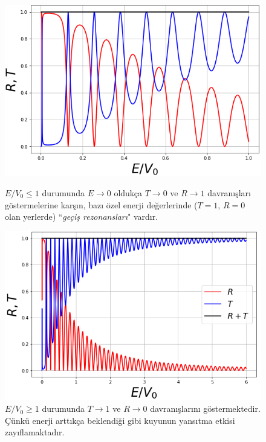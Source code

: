 \documentclass[a4paper,12pt, twoside]{article}
\begin{document}
\begin{figure}[hbtp]
\begin{minipage}{.48\textwidth}
	\centering
	\includegraphics[width=\linewidth]{figurler/SonluKuyu_Potansiyeli_TR_EV0_1.png}
	\caption{$E/V_0 \leq 1$ durumunda $E\rightarrow0$ oldukça $T\rightarrow0$ ve $R\rightarrow1$ davranışları göstermelerine karşın, bazı özel enerji değerlerinde ($T=1$, $R=0$ olan yerlerde) ``\emph{geçiş rezonansları}" vardır.}
	\label{fig:sonlukuyupot_EV0_1}
\end{minipage}
\hspace{24pt}
\begin{minipage}{.48\textwidth}
	\centering
	\includegraphics[width=\linewidth]{figurler/SonluKuyu_Potansiyeli_TR_EV0_2.png}
	\caption{$E/V_0\geq 1$ durumunda $T\rightarrow1$ ve $R\rightarrow0$ davranışlarını göstermektedir. Çünkü enerji arttıkça beklendiği gibi kuyunun yansıtma etkisi zayıflamaktadır.
	\vspace{12pt}}
	\label{fig:sonlukuyupot_EV0_2}
\end{minipage}
\end{figure}
\end{document}
